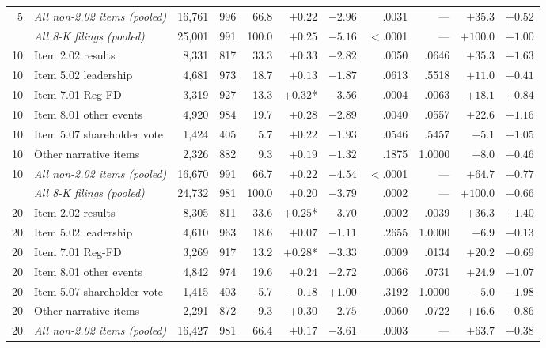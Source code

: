 \begin{table}[p]
\begin{tabular}{@{}rlrrrrrrrrr@{}}
5 & \emph{All non-2.02 items (pooled)} & 16{,}761 & 996 & 66.8 & $+0.22$\phantom{*} & $-2.96$ & .0031 & --- & $+35.3$ & $+0.52$ \\
\addlinespace
10 & \emph{All 8-K filings (pooled)} & 25{,}001 & 991 & 100.0 & $+0.25$\phantom{*} & $-5.16$ & $<$.0001 & --- & $+100.0$ & $+1.00$ \\
10 & Item 2.02 results & 8{,}331 & 817 & 33.3 & $+0.33$\phantom{*} & $-2.82$ & .0050 & .0646 & $+35.3$ & $+1.63$ \\
10 & Item 5.02 leadership & 4{,}681 & 973 & 18.7 & $+0.13$\phantom{*} & $-1.87$ & .0613 & .5518 & $+11.0$ & $+0.41$ \\
10 & Item 7.01 Reg-FD & 3{,}319 & 927 & 13.3 & $+0.32$* & $-3.56$ & .0004 & .0063 & $+18.1$ & $+0.84$ \\
10 & Item 8.01 other events & 4{,}920 & 984 & 19.7 & $+0.28$\phantom{*} & $-2.89$ & .0040 & .0557 & $+22.6$ & $+1.16$ \\
10 & Item 5.07 shareholder vote & 1{,}424 & 405 & 5.7 & $+0.22$\phantom{*} & $-1.93$ & .0546 & .5457 & $+5.1$ & $+1.05$ \\
10 & Other narrative items & 2{,}326 & 882 & 9.3 & $+0.19$\phantom{*} & $-1.32$ & .1875 & 1.0000 & $+8.0$ & $+0.46$ \\
10 & \emph{All non-2.02 items (pooled)} & 16{,}670 & 991 & 66.7 & $+0.22$\phantom{*} & $-4.54$ & $<$.0001 & --- & $+64.7$ & $+0.77$ \\
\addlinespace
20 & \emph{All 8-K filings (pooled)} & 24{,}732 & 981 & 100.0 & $+0.20$\phantom{*} & $-3.79$ & .0002 & --- & $+100.0$ & $+0.66$ \\
20 & Item 2.02 results & 8{,}305 & 811 & 33.6 & $+0.25$* & $-3.70$ & .0002 & .0039 & $+36.3$ & $+1.40$ \\
20 & Item 5.02 leadership & 4{,}610 & 963 & 18.6 & $+0.07$\phantom{*} & $-1.11$ & .2655 & 1.0000 & $+6.9$ & $-0.13$ \\
20 & Item 7.01 Reg-FD & 3{,}269 & 917 & 13.2 & $+0.28$* & $-3.33$ & .0009 & .0134 & $+20.2$ & $+0.69$ \\
20 & Item 8.01 other events & 4{,}842 & 974 & 19.6 & $+0.24$\phantom{*} & $-2.72$ & .0066 & .0731 & $+24.9$ & $+1.07$ \\
20 & Item 5.07 shareholder vote & 1{,}415 & 403 & 5.7 & $-0.18$\phantom{*} & $+1.00$ & .3192 & 1.0000 & $-5.0$ & $-1.98$ \\
20 & Other narrative items & 2{,}291 & 872 & 9.3 & $+0.30$\phantom{*} & $-2.75$ & .0060 & .0722 & $+16.6$ & $+0.86$ \\
20 & \emph{All non-2.02 items (pooled)} & 16{,}427 & 981 & 66.4 & $+0.17$\phantom{*} & $-3.61$ & .0003 & --- & $+63.7$ & $+0.38$ \\
\bottomrule
\end{tabular}
\end{table}

